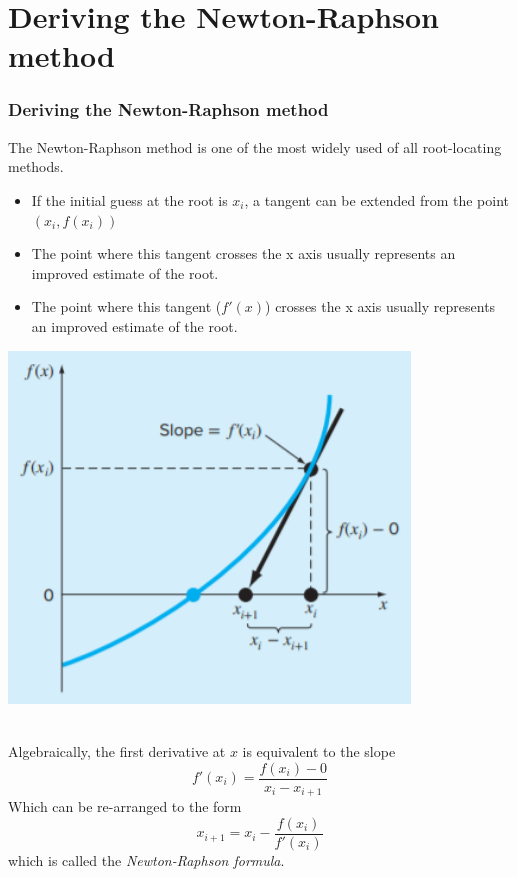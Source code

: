 \documentclass{if-beamer}
\begin{document}
\section{Deriving the Newton-Raphson method}
\begin{frame}
\frametitle{Deriving the Newton-Raphson method}
The Newton-Raphson method is one of the most widely used of all root-locating methods. \\
\begin{minipage}{0.5\textwidth}
	\begin{itemize}
		\item  If the initial guess at the root is $x_i$, a tangent can be extended from the point $(x_i,f(x_i))$
		\item  The point where this tangent crosses the x axis usually represents an improved estimate of the root.
		\item  The point where this tangent ($f'(x)$) crosses the x axis usually represents an improved estimate of the root.
	\end{itemize}
\end{minipage}
\begin{minipage}{0.5\textwidth}
	\includegraphics[width = 0.8\textwidth]{figures/NR}
\end{minipage}
\\\vspace{5pt}
Algebraically, the first derivative at $x$ is equivalent to the slope
$$f'(x_i) = \frac{f(x_i)-0}{x_i-x_{i+1}}$$
Which can be re-arranged to the form
$$x_{i+1} = x_i - \frac{f(x_i)}{f'(x_i)}$$
which is called the \textit{Newton-Raphson formula}.
\end{frame}
\end{document}
